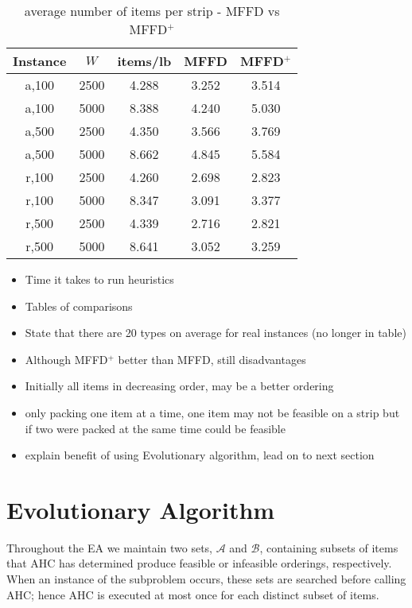 \documentclass{elsarticle}
\begin{document}
\begin{table}[h!]
\centering
\caption{average number of items per strip - MFFD vs MFFD$^+$}
	\begin{tabular}{ccccc}\toprule
		Instance & $W$ & items/lb & MFFD & MFFD$^+$ \\ \midrule	
		a,100 & 2500 & 4.288 & 3.252 & 3.514 \\
		a,100 & 5000 & 8.388 & 4.240 & 5.030 \\
		\midrule
		a,500 & 2500 & 4.350 & 3.566 & 3.769 \\
		a,500 & 5000 & 8.662 & 4.845 & 5.584 \\
		\midrule
		\midrule
		r,100 & 2500 & 4.260 & 2.698 & 2.823 \\
		r,100 & 5000 & 8.347 & 3.091 & 3.377 \\
		\midrule
		r,500 & 2500 & 4.339 & 2.716 & 2.821 \\
		r,500 & 5000 & 8.641 & 3.052 & 3.259 \\
		\bottomrule
	\end{tabular}	
\end{table}

\begin{itemize}
	\item Time it takes to run heuristics
	\item Tables of comparisons
	\item State that there are 20 types on average for real instances (no longer in table)
	\item Although MFFD$^+$ better than MFFD, still disadvantages
	\item Initially all items in decreasing order, may be a better ordering
	\item only packing one item at a time, one item may not be feasible on a strip but if two were packed at the same time could be feasible
	\item explain benefit of using Evolutionary algorithm, lead on to next section
\end{itemize}

\section{Evolutionary Algorithm}
\label{sec:ea}
Throughout the EA we maintain two sets, $\mathcal{A}$ and $\mathcal{B}$, containing subsets of items that AHC has determined produce feasible or infeasible orderings, respectively. When an instance of the subproblem occurs, these sets are searched before calling AHC; hence AHC is executed at most once for each distinct subset of items.
\end{document}
